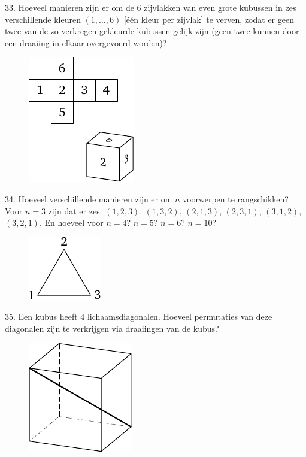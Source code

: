 \begin{problem}{33.}
	Hoeveel manieren zijn er om de 6 zijvlakken van even grote kubussen in zes verschillende kleuren $(1,\dotsc,6)$ [één kleur per zijvlak] te verven, zodat er geen twee van de zo verkregen gekleurde kubussen gelijk zijn (geen twee kunnen door een draaiing in elkaar overgevoerd worden)?
	\begin{figure}
		\includegraphics{resources/taskbook-17}
	\end{figure}
\end{problem}

\begin{problem}{34.}
	Hoeveel verschillende manieren zijn er om $n$ voorwerpen te rang\-schikken? Voor $n = 3$ zijn dat er zes: $(1,2,3)$, $(1,3,2)$, $(2,1,3)$, $(2,3,1)$, $(3,1,2)$, $(3,2,1)$. En hoeveel voor $n = 4$? $n = 5$? $n = 6$? $n = 10$?
	\begin{figure}
		\includegraphics{resources/taskbook-18}
	\end{figure}
\end{problem}

\clearpage

\begin{problem}{35.}
	Een kubus heeft 4 lichaamsdiagonalen. Hoeveel permutaties van deze diagonalen zijn te verkrijgen via draaiingen van de kubus?
	\begin{figure}
		\includegraphics{resources/taskbook-19}
	\end{figure}
\end{problem}

